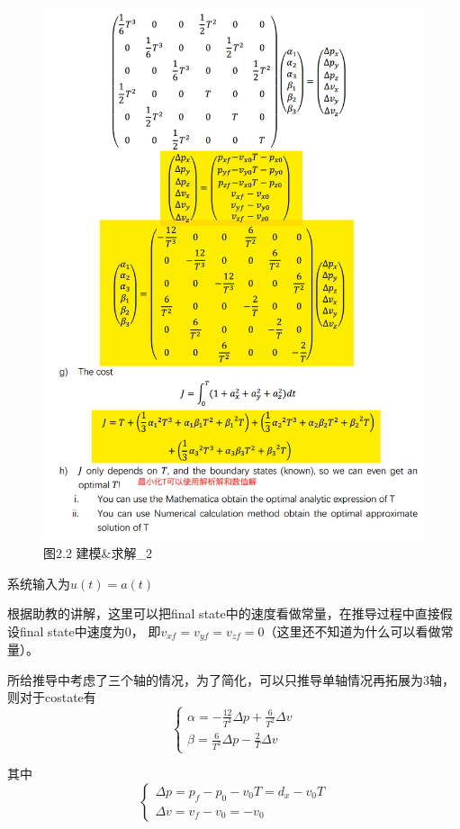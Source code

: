 \documentclass[40pt,a4paper,UTF8]{ctexart}
\numberwithin{equation}{section}
\begin{document}
\begin{figure}[H]
\centering
\includegraphics[width=4.8in]{ch4_17.png} {图2.2 建模\&求解\_2}
\end{figure}

系统输入为$u(t)=a(t)$

根据助教的讲解，这里可以把final state中的速度看做常量，在推导过程中直接假设final state中速度为0，
即$v_{xf}=v_{yf}=v_{zf}=0$（这里还不知道为什么可以看做常量）。

所给推导中考虑了三个轴的情况，为了简化，可以只推导单轴情况再拓展为3轴，则对于costate有
\begin{equation}
    \left\{
        \begin{array}{l}
            \alpha = -\frac{12}{T^3}\Delta p +\frac{6}{T^2}\Delta v\\
            \beta = \frac{6}{T^2}\Delta p -\frac{2}{T}\Delta v
        \end{array}
    \right.
\end{equation}

其中
\begin{equation}
    \left\{
        \begin{array}{l}
            \Delta p = p_f - p_0 -v_0T=d_x-v_0T\\
            \Delta v = v_f - v_0 = -v_0
        \end{array}
    \right.
\end{equation}
\end{document}
